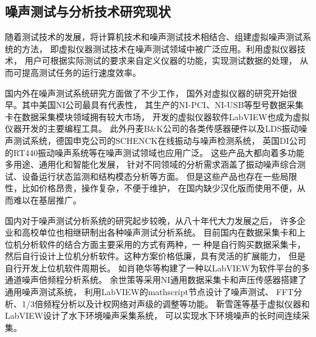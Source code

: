 \subsection{噪声测试与分析技术研究现状}
\begin{comment}
水下环境噪声数据采集装置对于水声试验来说是不可缺少的，因此设计
一套高性能的、能够适应水声信号特点的数据采集
系统十分必要。水声信号在水中传播时，水中的自然
环境极其复杂，要求所采用的数据采集器能够适应水下恶劣的自然环境，不但具有较大的动态范围，
所采集信号的幅度范围要尽可能宽，而且试验现场的数据量很大，常常需要多通道同步进行数据采集，
这样，对数据采集器提出了很高的要求。另外，从节约成本的角度考虑，又要求所采用的系统应该具有
一定的通用性和灵活的扩展能力。文中所要完成的
工作正是基于这一目的而展开的。

随着测试技术的发展，目前对传统的复杂仪器，分析方法的依赖性在减少，而正在流行着一种 
将计算机技术和噪声测试技术相结合、组建虚拟噪 
声测试系统的方法，即将虚拟仪器技术的测试技术 
引到噪声测试领域中，借助计算机软件技术来设计 
噪声分析软件。


\end{comment}
随着测试技术的发展，将计算机技术和噪声测试技术相结合、组建虚拟噪声测试系统的方法，
即虚拟仪器测试技术在噪声测试领域中被广泛应用\cite{yu2018}。利用虚拟仪器技术，
用户可根据实际测试的要求来自定义仪器的功能，实现测试数据的处理，
从而可提高测试任务的运行速度效率\cite{tang2021}。

国内外在噪声测试系统研究方面做了不少工作，
国外对虚拟仪器的研究开始很早。其中美国NI公司最具有代表性，
其生产的NI-PCI、NI-USB等型号数据采集卡在数据采集模块领域拥有较大市场，
开发的虚拟仪器软件LabVIEW也成为虚拟仪器开发的主要编程工具\cite{2007Labview}。
此外丹麦B\&K公司的各类传感器硬件以及LDS振动噪声测试系统，德国申克公司的SCHENCK在线振动与噪声检测系统，
英国DI公司的RT440振动噪声系统等在噪声测试领域也应用广泛\cite{dingJi2014}。
这些产品大都向着多功能多用途、通用化和智能化发展，
针对不同领域的分析需求涵盖了振动噪声综合测试、设备运行状态监测和结构模态分析等方面。
但是这些产品也存在一些局限性，比如价格昂贵，操作复杂，不便于维护，
在国内缺少汉化版而使用不便，从而难以在基层推广\cite{boMeasurementSystemWind2011}。

国内对于噪声测试分析系统的研究起步较晚，从八十年代大力发展之后，
许多企业和高校单位也相继研制出各种噪声测试分析系统\cite{jiangJi2020,sun2020}。
目前国内在数据采集卡和上位机分析软件的结合方面主要采用的方式有两种，一
种是自行购买数据采集卡，然后自行设计上位机分析软件\cite{王凡2006自制}。这种方案价格低廉，具有灵活的扩展能力，
但是自行开发上位机软件周期长。
如肖艳华等\cite{xiaoJiYu2017}构建了一种以LabVIEW为软件平台的多通道噪声倍频程分析系统。
余世策等\cite{余世策2016基于虚拟仪器的噪声测试系统研发}采用NI通用数据采集卡和声压传感器搭建了通用噪声测试系统，
利用LabVIEW的mathscript节点设计了噪声测试、 FFT分析、1/3倍频程分析以及计权网络对声级的调整等功能。
靳雪莲等\cite{jinxuelian2010}基于虚拟仪器和LabVIEW设计了水下环境噪声采集系统，
可以实现水下环境噪声的长时间连续采集。

